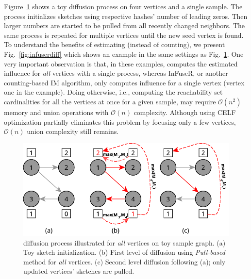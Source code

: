 \documentclass[final,5p,times,twocolumn]{elsarticle}
\newcommand\acro{{\sc{HyperFuseR\xspace}\xspace}\xspace}
\begin{document}
Figure~\ref{fig:hyperdiff} shows a toy diffusion process on four vertices and a single sample. The process initializes sketches using respective hashes' number of leading zeros. Then larger numbers are started to be pulled from all recently changed neighbors. The same process is repeated for multiple vertices until the new seed vertex is found. To understand the benefits of estimating (instead of counting), we present Fig.~\ref{fig:infuserdiff} which shows an example in the same settings as Fig.~\ref{fig:hyperdiff}. One very important observation is that, in these examples, \acro{} computes the estimated influence for \emph{all} vertices with a single process, whereas {\sc InFuseR}, or another counting-based IM algorithm, only computes influence for a single vertex (vertex one in the example). Doing otherwise, i.e., computing the reachability set cardinalities for all the vertices at once for a given sample, may require $\mathcal{O}(n^2)$ memory and union operations with $\mathcal{O}(n)$ complexity. Although using CELF~\cite{CELF} optimization partially eliminates this problem by focusing only a few vertices, $\mathcal{O}(n)$ union complexity still remains.
\begin{figure}[!ht]
    \begin{center}
    \includegraphics[width=0.85\linewidth]{images/sketchdiff.pdf}
    \caption{\acro diffusion process illustrated for \emph{all} vertices on toy sample graph. (a)\label{hyperinit} Toy sketch initialization. (b) \label{hyperdiff1} First level of diffusion using \emph{Pull-based} method for \emph{all} vertices. (c) \label{hyperdiff2} Second level diffusion following (a); only updated vertices' sketches are pulled. 
     }\label{fig:hyperdiff} 
    \end{center}
\end{figure}
\end{document}
